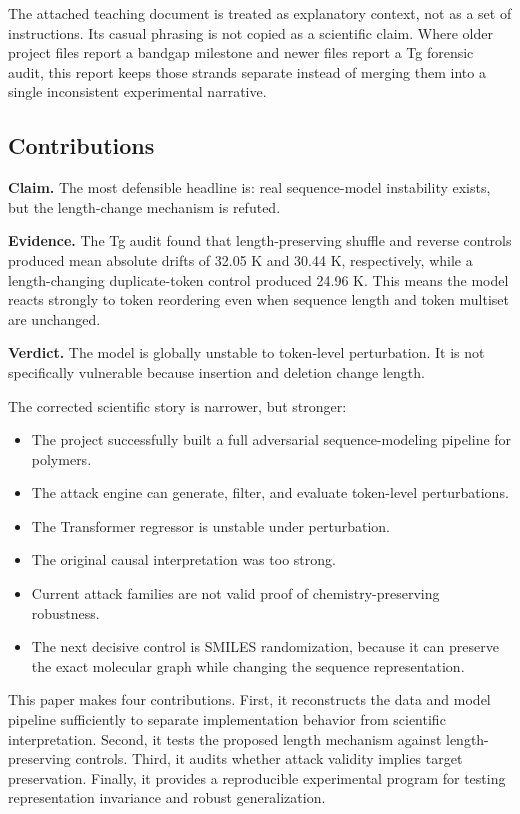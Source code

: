 \documentclass[11pt]{article}
\newcommand{\claim}[1]{\noindent\textbf{Claim.} #1}
\newcommand{\evidence}[1]{\noindent\textbf{Evidence.} #1}
\newcommand{\verdict}[1]{\noindent\textbf{Verdict.} #1}
\begin{document}
The attached teaching document is treated as explanatory context, not as a set
of instructions. Its casual phrasing is not copied as a scientific claim. Where
older project files report a bandgap milestone and newer files report a Tg
forensic audit, this report keeps those strands separate instead of merging them
into a single inconsistent experimental narrative.

\subsection{Contributions}

\claim{The most defensible headline is: real sequence-model instability exists, but the length-change mechanism is refuted.}

\evidence{The Tg audit found that length-preserving shuffle and reverse controls produced mean absolute drifts of 32.05 K and 30.44 K, respectively, while a length-changing duplicate-token control produced 24.96 K. This means the model reacts strongly to token reordering even when sequence length and token multiset are unchanged.}

\verdict{The model is globally unstable to token-level perturbation. It is not specifically vulnerable because insertion and deletion change length.}

\medskip

The corrected scientific story is narrower, but stronger:
\begin{itemize}
  \item The project successfully built a full adversarial sequence-modeling pipeline for polymers.
  \item The attack engine can generate, filter, and evaluate token-level perturbations.
  \item The Transformer regressor is unstable under perturbation.
  \item The original causal interpretation was too strong.
  \item Current attack families are not valid proof of chemistry-preserving robustness.
  \item The next decisive control is SMILES randomization, because it can preserve the exact molecular graph while changing the sequence representation.
\end{itemize}

This paper makes four contributions. First, it reconstructs the data and model
pipeline sufficiently to separate implementation behavior from scientific
interpretation. Second, it tests the proposed length mechanism against
length-preserving controls. Third, it audits whether attack validity implies
target preservation. Finally, it provides a reproducible experimental program
for testing representation invariance and robust generalization.
\end{document}
